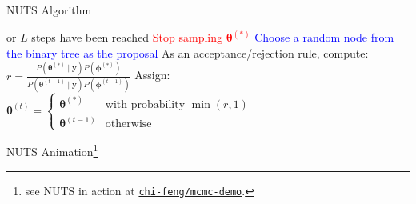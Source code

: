 \begin{frame}{NUTS Algorithm}
\begin{algorithm}[H]
{{{					or $L$ steps have been reached\;
				}{
					\textcolor{red}{Stop sampling $\boldsymbol{\theta}^{(*)}$\;
					}
				}
			}
		}
		\textcolor{blue}{Choose a random node from the binary tree as the proposal}\;
		As an acceptance/rejection rule, compute:
		$r = \frac{P \left(\boldsymbol{\theta}^{(*)} \mid \mathbf{y} \right) P \left(\boldsymbol{\phi}^{(*)} \right)}{P \left(\boldsymbol{\theta}^{(t-1)} \mid \mathbf{y} \right) P \left(\boldsymbol{\phi}^{(t-1)} \right)}$\;
		Assign:
		$
			\boldsymbol{\theta}^{(t)} =
			\begin{cases}
				\boldsymbol{\theta}^{(*)}   & \text{with probability $\min(r,1)$} \\
				\boldsymbol{\theta}^{(t-1)} & \text{otherwise}
			\end{cases}
		$\;
		\caption{No-U-Turn-Sampler (NUTS)}
	\end{algorithm}
\end{frame}

\begin{frame}{NUTS Animation\footnote{see NUTS in action at \href{https://chi-feng.github.io/mcmc-demo/app.html?algorithm=EfficientNUTS&target=banana}{\texttt{chi-feng/mcmc-demo}}.}}
	\centering
\end{frame}

